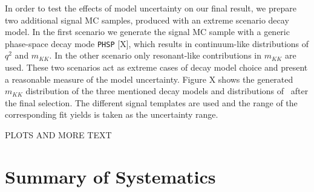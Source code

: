 In order to test the effects of model uncertainty on our final result, we prepare two additional signal MC samples, produced with an extreme scenario decay model. In the first scenario we generate the signal MC sample with a generic phase-space decay mode \texttt{PHSP} [X], which results in continuum-like distributions of $q^2$ and $m_{KK}$. In the other scenario only resonant-like contributions in $m_{KK}$ are used. These two scenarios act as extreme cases of decay model choice and present a reasonable measure of the model uncertainty. Figure X shows the generated $m_{KK}$ distribution of the three mentioned decay models and distributions of \vars~after the final selection. The different signal templates are used and the range of the corresponding fit yields is taken as the uncertainty range.

PLOTS AND MORE TEXT

\section{Summary of Systematics}